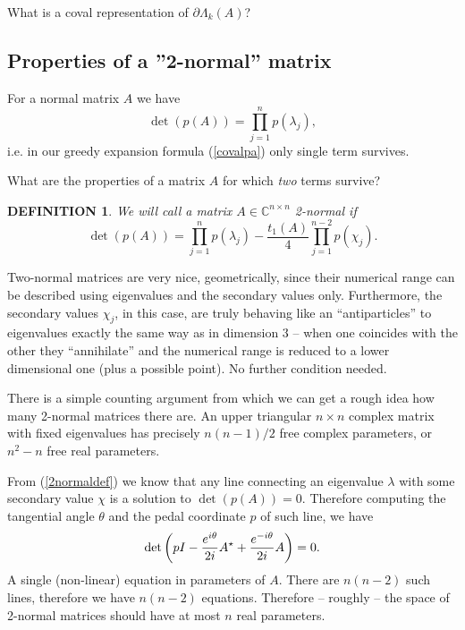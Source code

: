\documentclass[10pt,a4paper,reqno]{amsart}
\newtheorem{defi}{\bf D\scriptsize EFINITION \normalsize}
\newenvironment{definition}{\begin{defi}\rm}{\end{defi}}
\newcommand{\zav}[1]{\left( #1 \right)}
\newcommand{\imag}{{\rm i}}
\newcommand{\deter}[1]{\det\zav{#1}}
\begin{document}
What is a coval representation of $\partial \Lambda_k(A)$?

\subsection*{Properties of a ''2-normal'' matrix}
For a normal matrix $A$ we have 
$$
\deter{p(A)}=\prod_{j=1}^n p(\lambda_j),
$$
i.e. in our greedy expansion formula (\ref{covalpa}) only single term survives.

What are the properties of a matrix $A$ for which \textit{two} terms survive? 
\begin{definition}
We will call a matrix $A\in\mathbb{C}^{n\times n}$ \textit{2-normal} if
\begin{equation}\label{2normaldef}
\deter{p(A)}=\prod_{j=1}^n p(\lambda_j)-\frac{t_1(A)}{4}\prod_{j=1}^{n-2}p(\chi_j).
\end{equation}
\end{definition}
Two-normal matrices are very nice, geometrically, since their numerical range can be described using eigenvalues and the secondary values only.
Furthermore, the secondary values $\chi_j$, in this case, are truly behaving like an ``antiparticles'' to eigenvalues exactly the same way as in dimension 3 -- when one coincides with the other they ``annihilate'' and the numerical range is reduced to a lower dimensional one (plus a possible point). No further condition needed.

There is a simple counting argument from which we can get a rough idea how many 2-normal matrices there are. An upper triangular $n\times n$ complex matrix with fixed eigenvalues has precisely $n(n-1)/2$ free complex parameters, or $n^2-n$ free real parameters.

From (\ref{2normaldef}) we know that any line connecting an eigenvalue $\lambda$ with some secondary value $\chi$ is a solution to $\deter{p(A)}=0$. Therefore computing the tangential angle $\theta$ and the pedal coordinate $p$ of such line, we have
$$
\deter{p I-\frac{e^{\imag\theta}}{2\imag} A^\star+\frac{e^{-\imag \theta}}{2\imag} A}=0.
$$
A single (non-linear) equation in parameters of $A$.
There are $n(n-2) $ such lines, therefore we have $n(n-2)$ equations. Therefore -- roughly -- the space of 2-normal matrices should have at most $n$ real parameters.
\bigskip
\end{document}
